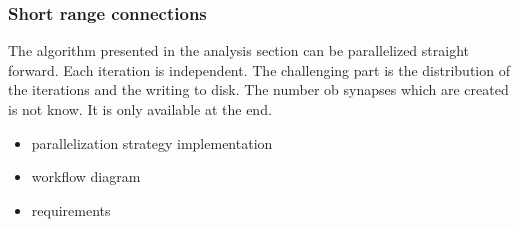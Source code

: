 \documentclass[a4paper]{article}
\begin{document}
\subsubsection{Short range connections}

The algorithm presented in the analysis section can be parallelized straight forward.
Each iteration is independent. The challenging part is the distribution of the iterations and
the writing to disk. The number ob synapses which are created is not know. It is only available
at the end.
\begin{itemize}
      \item parallelization strategy implementation
      \item workflow diagram
      \item requirements
\end{itemize}
\end{document}
